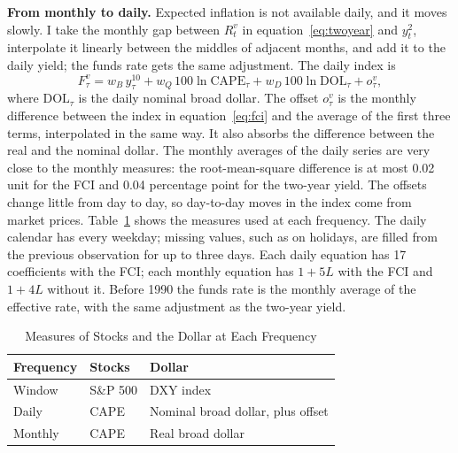 \documentclass[11pt]{article}
\begin{document}
\begin{appendices}
\textbf{From monthly to daily.} Expected inflation is not available daily, and it moves slowly. I take the monthly gap between $R_t^{v}$ in equation~\eqref{eq:twoyear} and $y^{2}_t$, interpolate it linearly between the middles of adjacent months, and add it to the daily yield; the funds rate gets the same adjustment. The daily index is
\begin{equation}
F_\tau^{v} = w_B\, y^{10}_\tau + w_Q\, 100\ln\text{CAPE}_\tau + w_D\, 100\ln\text{DOL}_\tau + o_\tau^{v}, \label{eq:dailyfci}
\end{equation}
where $\text{DOL}_\tau$ is the daily nominal broad dollar. The offset $o_\tau^{v}$ is the monthly difference between the index in equation~\eqref{eq:fci} and the average of the first three terms, interpolated in the same way. It also absorbs the difference between the real and the nominal dollar. The monthly averages of the daily series are very close to the monthly measures: the root-mean-square difference is at most 0.02 unit for the FCI and 0.04 percentage point for the two-year yield. The offsets change little from day to day, so day-to-day moves in the index come from market prices. Table~\ref{tab:measures} shows the measures used at each frequency. The daily calendar has every weekday; missing values, such as on holidays, are filled from the previous observation for up to three days. Each daily equation has 17 coefficients with the FCI; each monthly equation has $1+5L$ with the FCI and $1+4L$ without it. Before 1990 the funds rate is the monthly average of the effective rate, with the same adjustment as the two-year yield.

\begin{table}[tp]\centering\small
\caption{Measures of Stocks and the Dollar at Each Frequency}\label{tab:measures}
\begin{tabular}{lll}\toprule
Frequency & Stocks & Dollar \\\midrule
Window & S\&P 500 & DXY index \\
Daily & CAPE & Nominal broad dollar, plus offset \\
Monthly & CAPE & Real broad dollar \\\bottomrule
\end{tabular}
\end{table}


\end{appendices}
\end{document}

